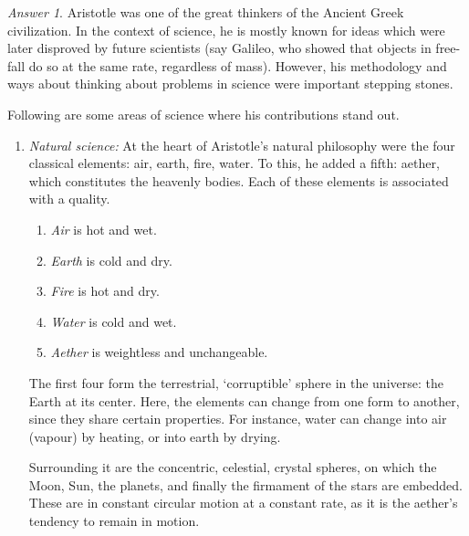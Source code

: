 \documentclass[11pt]{article}
\theoremstyle{remark}
\newtheorem*{answer}{Answer}
\begin{document}
    \begin{answer}
        Aristotle was one of the great thinkers of the Ancient Greek civilization.
        In the context of science, he is mostly known for ideas which were later
        disproved by future scientists (say Galileo, who showed that objects in
        free-fall do so at the same rate, regardless of mass). However, his
        methodology and ways about thinking about problems in science were important
        stepping stones.

        Following are some areas of science where his contributions stand out.
        \begin{enumerate}
            \item \textit{Natural science:} At the heart of Aristotle's natural
            philosophy were the four classical elements: air, earth, fire, water. To
            this, he added a fifth: aether, which constitutes the heavenly bodies.
            Each of these elements is associated with a quality.
            \begin{enumerate}
                \item \textit{Air} is hot and wet.
                \item \textit{Earth} is cold and dry. 
                \item \textit{Fire} is hot and dry.
                \item \textit{Water} is cold and wet.
                \item \textit{Aether} is weightless and unchangeable.
            \end{enumerate}
            The first four form the terrestrial, `corruptible' sphere in the
            universe: the Earth at its center. Here, the elements can change from one
            form to another, since they share certain properties. For instance, water
            can change into air (vapour) by heating, or into earth by drying.

            Surrounding it are the concentric, celestial, crystal spheres, on which
            the Moon, Sun, the planets, and finally the firmament of the stars are
            embedded. These are in constant circular motion at a constant rate, as it
            is the aether's tendency to remain in motion.


\end{enumerate}
\end{answer}
\end{document}
